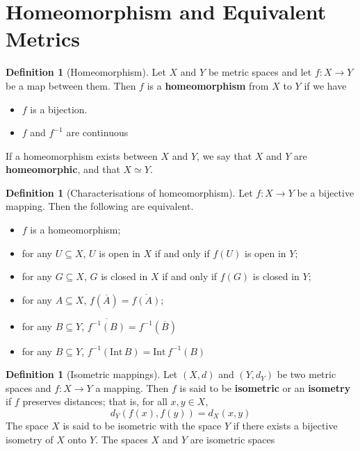 \documentclass[10pt, oneside, reqno]{amsart}
\theoremstyle{plain}%
\theoremstyle{definition}
\newtheorem{defn}[thm]{Definition}
\theoremstyle{remark}
\newcommand{\met}{(X,d)}
\newcommand{\intr}{\text{Int}\,}
\newcommand{\ol}[1]{\overline{#1}}
\begin{document}
\section{Homeomorphism and Equivalent Metrics} %
\label{sec:homeomorphism_and_equivalent_metrics}
\begin{defn}[Homeomorphism]
    Let $X$ and $Y$ be metric spaces and let $f: X \rightarrow Y$ be a map between them.  Then $f$ is a \textbf{homeomorphism} from $X$ to $Y$ if we have \begin{itemize}
        \item $f$ is a bijection.
        \item $f$ and $f^{-1}$ are continuous
    \end{itemize}

    If a homeomorphism exists between $X$ and $Y$, we say that $X$ and $Y$ are \textbf{homeomorphic}, and that $X \simeq Y$.
\end{defn}

\begin{defn}[Characterisations of homeomorphism]
Let $f: X \rightarrow Y$ be a bijective mapping.  Then the following are equivalent.
\begin{itemize}
    \item $f$ is a homeomorphism;
    \item for any $U \subseteq X$, $U$ is open in $X$ if and only if $f(U)$ is open in $Y$;
    \item for any $G \subseteq X$, $G$ is closed in $X$ if and only if $f(G)$ is closed in $Y$;
    \item for any $A \subseteq X$, $f(\ol{A}) = \ol{f(A)}$;
    \item for any $B \subseteq Y$, $\ol{f^{-1}(B)} = f^{-1}(\ol{B})$
    \item for any $B \subseteq Y$, $f^{-1}(\intr B) = \intr f^{-1}(B)$
\end{itemize}
\end{defn}

\begin{defn}[Isometric mappings]
    Let $\met$ and $(Y, d_Y)$ be two metric spaces and $f: X \rightarrow Y$ a mapping.  Then $f$ is said to be \textbf{isometric} or an \textbf{isometry} if $f$ preserves distances; that is, for all $x,y \in X$, \[
        d_Y(f(x), f(y)) = d_X(x,y)
    \]
    The space $X$ is said to be isometric with the space $Y$ if there exists a bijective isometry of $X$ onto $Y$.  The spaces $X$ and $Y$ are isometric spaces
\end{defn}
\end{document}
